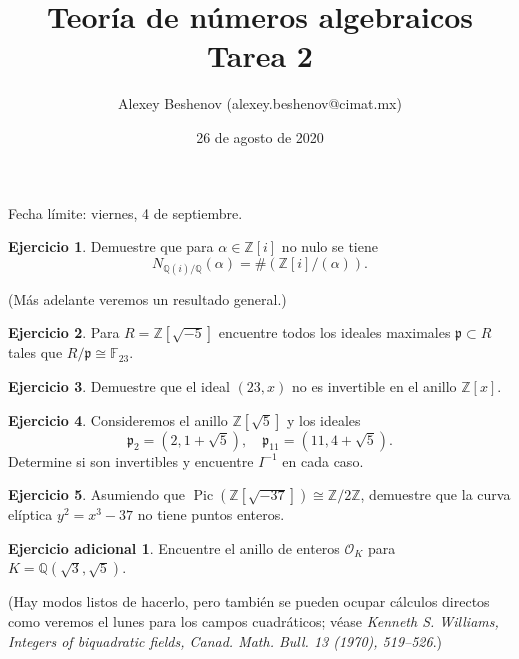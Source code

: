 \documentclass{article}
\title{Teoría de números algebraicos\\Tarea 2}
\author{Alexey Beshenov (alexey.beshenov@cimat.mx)}
\date{26 de agosto de 2020}
\newcounter{tarea}
\theoremstyle{definition}
\newtheorem{ejercicio}{Ejercicio}[tarea]
\newtheorem*{ejercicio-adicional}{Ejercicio adicional}
\begin{document}
{\sffamily\bfseries\maketitle}

\noindent Fecha límite: viernes, 4 de septiembre.

\ifdefined\solutions
\else
\thispagestyle{empty}
\fi

\begin{ejercicio}
  Demuestre que para $\alpha \in \mathbb{Z} [i]$ no nulo se tiene
  $$N_{\mathbb{Q} (i)/\mathbb{Q}} (\alpha) = \# (\mathbb{Z} [i]/(\alpha)).$$

\noindent (Más adelante veremos un resultado general.)
\end{ejercicio}

\begin{ejercicio}
  Para $R = \mathbb{Z} [\sqrt{-5}]$ encuentre todos los ideales maximales
  $\mathfrak{p} \subset R$ tales que $R/\mathfrak{p} \cong \mathbb{F}_{23}$.
\end{ejercicio}

\begin{ejercicio}
  Demuestre que el ideal $(23,x)$ no es invertible en el anillo
  $\mathbb{Z} [x]$.
\end{ejercicio}

\begin{ejercicio}
  Consideremos el anillo $\mathbb{Z} [\sqrt{5}]$ y los ideales
  \[ \mathfrak{p}_2 = (2, 1 + \sqrt{5}), \quad
     \mathfrak{p}_{11} = (11, 4 + \sqrt{5}). \]
  Determine si son invertibles y encuentre $I^{-1}$ en cada caso.
\end{ejercicio}

\begin{ejercicio}
  Asumiendo que $\operatorname{Pic} (\mathbb{Z} [\sqrt{-37}]) \cong \mathbb{Z}/2\mathbb{Z}$,
  demuestre que la curva elíptica $y^2 = x^3 - 37$ no tiene puntos enteros.
\end{ejercicio}

\begin{ejercicio-adicional}
  Encuentre el anillo de enteros $\mathcal{O}_K$ para
  $K = \mathbb{Q} (\sqrt{3}, \sqrt{5})$.

  \noindent (Hay modos listos de hacerlo, pero también se pueden ocupar cálculos
  directos como veremos el lunes para los campos cuadráticos; véase
  \emph{Kenneth S. Williams, Integers of biquadratic fields,
    Canad. Math. Bull. 13 (1970), 519--526}.)
\end{ejercicio-adicional}
\end{document}
